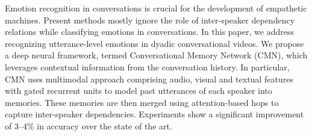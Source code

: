 Emotion recognition in conversations is crucial for the development of empathetic machines. Present methods mostly ignore the role of inter-speaker dependency relations while classifying emotions in conversations. In this paper, we address recognizing utterance-level emotions in dyadic conversational videos. We propose a deep neural framework, termed Conversational Memory Network (CMN), which leverages contextual information from the conversation history. In particular, CMN uses multimodal approach comprising audio, visual and textual features with gated recurrent units to model past utterances of each speaker into memories. These memories are then merged using attention-based hops to capture inter-speaker dependencies. Experiments show a significant improvement of 3--4\% in accuracy over the state of the art.
